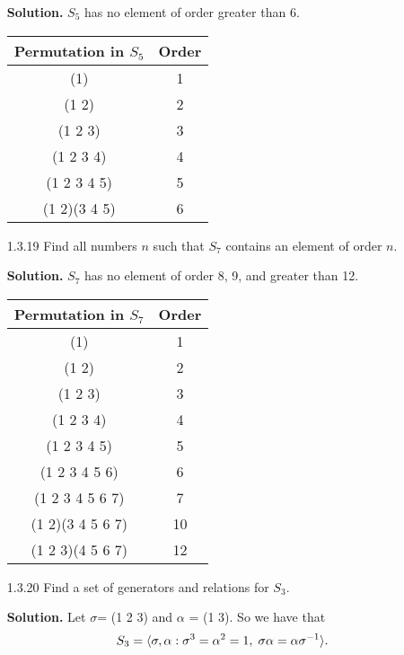 \begin{enumerate}
      \textbf{Solution.} $S_5$ has no element of order greater than 6.
      \begin{center}
         \begin{tabular}{@{}|c|c|@{}}   \hline
            Permutation in $S_5$    & Order   \\ \hline
            (1)          & 1       \\ \hline
            (1 2)        & 2       \\ \hline 
            (1 2 3)      & 3       \\ \hline
            (1 2 3 4)    & 4       \\ \hline
            (1 2 3 4 5)  & 5       \\ \hline
            (1 2)(3 4 5) & 6       \\ \hline
         \end{tabular}
      \end{center}
   \item[1.3.19]  Find all numbers $n$ such that $S_7$ contains an element of
                  order $n$.

      \textbf{Solution.} $S_7$ has no element of order 8, 9, and greater than
      12.
      \begin{center}
         \begin{tabular}{@{}|c|c|@{}}   \hline
            Permutation in $S_7$    & Order   \\ \hline
            (1)              & 1       \\ \hline
            (1 2)            & 2       \\ \hline 
            (1 2 3)          & 3       \\ \hline
            (1 2 3 4)        & 4       \\ \hline
            (1 2 3 4 5)      & 5       \\ \hline
            (1 2 3 4 5 6)    & 6       \\ \hline
            (1 2 3 4 5 6 7)  & 7       \\ \hline
            (1 2)(3 4 5 6 7) & 10      \\ \hline
            (1 2 3)(4 5 6 7) & 12      \\ \hline
         \end{tabular}
      \end{center}
   \item[1.3.20]  Find a set of generators and relations for $S_3$.

      \textbf{Solution.} Let $\sigma$= (1 2 3) and $\alpha$ = (1 3). So we have 
      that
      $$S_3 = \langle \sigma, \alpha : \sigma^3 = \alpha^2 = 1, \;
                   \sigma\alpha = \alpha\sigma^{-1} \rangle.$$
\end{enumerate}

